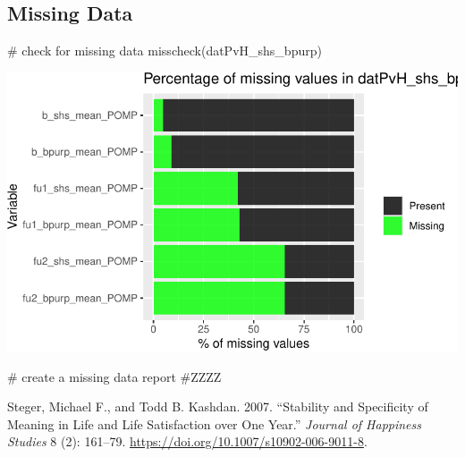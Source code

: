 \documentclass[
  letterpaper,
  DIV=11,
  numbers=noendperiod]{scrartcl}
\newenvironment{Shaded}{\begin{snugshade}}{\end{snugshade}}
\newcommand{\CommentTok}[1]{\textcolor[rgb]{0.37,0.37,0.37}{#1}}
\newcommand{\FunctionTok}[1]{\textcolor[rgb]{0.28,0.35,0.67}{#1}}
\newcommand{\NormalTok}[1]{\textcolor[rgb]{0.00,0.23,0.31}{#1}}
\newlength{\cslhangindent}
\newenvironment{CSLReferences}[2] %
 {\begin{list}{}{%
  \setlength{\itemindent}{0pt}
  \setlength{\leftmargin}{0pt}
  \setlength{\parsep}{0pt}
  \ifodd #1
   \setlength{\leftmargin}{\cslhangindent}
   \setlength{\itemindent}{-1\cslhangindent}
  \fi
  \setlength{\itemsep}{#2\baselineskip}}}
 {\end{list}}
\begin{document}
\subsection{Missing Data}\label{missing-data}

\begin{Shaded}
\begin{Highlighting}[]
\CommentTok{\# check for missing data}
\FunctionTok{misscheck}\NormalTok{(datPvH\_shs\_bpurp)}
\end{Highlighting}
\end{Shaded}

\includegraphics{purpose_vs_happiness_supplement_files/figure-pdf/missing_data-1.pdf}

\begin{Shaded}
\begin{Highlighting}[]
\CommentTok{\# create a missing data report}
\CommentTok{\#ZZZZ}
\end{Highlighting}
\end{Shaded}

\label{refs}
\begin{CSLReferences}{1}{0}
Steger, Michael F., and Todd B. Kashdan. 2007. {``Stability and
Specificity of Meaning in Life and Life Satisfaction over One Year.''}
\emph{Journal of Happiness Studies} 8 (2): 161--79.
\url{https://doi.org/10.1007/s10902-006-9011-8}.

\end{CSLReferences}
\end{document}
